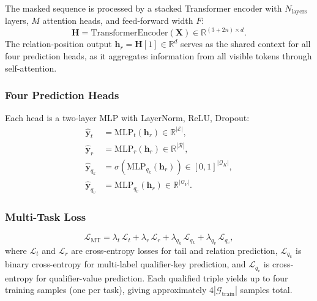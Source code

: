 \documentclass[10pt,journal,compsoc]{IEEEtran}
\begin{document}
The masked sequence is processed by a stacked Transformer
encoder with $N_{\mathrm{layers}}$ layers,
$M$ attention heads, and feed-forward width $F$:
\begin{equation}
  \mathbf{H}
  = \mathrm{TransformerEncoder}(\mathbf{X})
  \in \mathbb{R}^{(3+2n)\times d}.
  \label{eq:mt_enc}
\end{equation}
The relation-position output
$\mathbf{h}_r = \mathbf{H}[1] \in \mathbb{R}^d$
serves as the shared context for all four prediction heads,
as it aggregates information from all visible tokens
through self-attention.

\subsubsection{Four Prediction Heads}
\label{sssec:mtas_heads}

Each head is a two-layer MLP with LayerNorm, ReLU, Dropout:
\begin{align}
  \hat{\mathbf{y}}_t
  &= \mathrm{MLP}_t(\mathbf{h}_r)
   \in \mathbb{R}^{|\mathcal{E}|},
  \label{eq:mt_tail} \\
  \hat{\mathbf{y}}_r
  &= \mathrm{MLP}_r(\mathbf{h}_r)
   \in \mathbb{R}^{|\mathcal{R}|},
  \label{eq:mt_rel} \\
  \hat{\mathbf{y}}_{q_k}
  &= \sigma\!\left(
       \mathrm{MLP}_{q_k}(\mathbf{h}_r)
     \right)
   \in [0,1]^{|\mathcal{Q}_K|},
  \label{eq:mt_qkey} \\
  \hat{\mathbf{y}}_{q_v}
  &= \mathrm{MLP}_{q_v}(\mathbf{h}_r)
   \in \mathbb{R}^{|\mathcal{Q}_V|}.
  \label{eq:mt_qval}
\end{align}

\subsubsection{Multi-Task Loss}
\label{sssec:mtas_loss}

\begin{equation}
  \mathcal{L}_{\mathrm{MT}}
  = \lambda_t\,\mathcal{L}_t
  + \lambda_r\,\mathcal{L}_r
  + \lambda_{q_k}\,\mathcal{L}_{q_k}
  + \lambda_{q_v}\,\mathcal{L}_{q_v},
  \label{eq:mt_loss}
\end{equation}
where $\mathcal{L}_t$ and $\mathcal{L}_r$ are
cross-entropy losses for tail and relation prediction,
$\mathcal{L}_{q_k}$ is binary cross-entropy for
multi-label qualifier-key prediction,
and $\mathcal{L}_{q_v}$ is cross-entropy for
qualifier-value prediction.
Each qualified triple yields up to four training samples
(one per task), giving approximately
$4|\mathcal{G}_{\mathrm{train}}|$ samples total.
\end{document}
